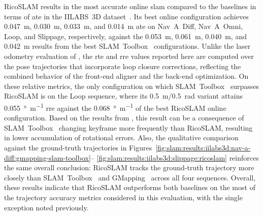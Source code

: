 RicoSLAM results in the most accurate online \gls{slam} compared to the
baselines in terms of \gls{ate} in the IILABS~3D dataset~\cite{ribeiro:access:2025}.
Its best online configuration achieves \SI{0.047}{\metre}, \SI{0.030}{\metre},
\SI{0.033}{\metre}, and \SI{0.014}{\metre} \gls{ate} on
Nav~A~Diff, Nav~A~Omni, Loop, and Slippage, respectively, against
the \SI{0.053}{\metre}, \SI{0.061}{\metre}, \SI{0.040}{\metre}, and
\SI{0.042}{\metre} results from the best
SLAM~Toolbox~\cite{macenski-jambrecic:joss:2021} configurations.
Unlike the laser odometry evaluation of ,
the \gls{rte} and \gls{rre} values reported here are computed over
the pose trajectories that incorporate loop closure corrections, reflecting
the combined behavior of the front-end aligner and the back-end optimization.
On these relative metrics, the only configuration on which
SLAM~Toolbox~\cite{macenski-jambrecic:joss:2021} surpasses RicoSLAM is on
the Loop sequence, where its \SI{0.5}{\metre}/\SI{0.5}{\radian} variant
attains \SI{0.055}{\degree\per\metre} \gls{rre} against the
\SI{0.068}{\degree\per\metre} of the best RicoSLAM online configuration.
Based on the results from , this
result can be a consequence of SLAM~Toolbox~\cite{macenski-jambrecic:joss:2021}
changing keyframe more frequently than RicoSLAM, resulting in lower accumulation
of rotational errors.
Also, the qualitative comparison against the ground-truth trajectories in
Figures~\ref{fig:slam:results:iilabs3d:nav-a-diff:gmapping-slam-toolbox}--%
\ref{fig:slam:results:iilabs3d:slippage:ricoslam} reinforces the same
overall conclusion: RicoSLAM tracks the ground-truth trajectory more closely
than SLAM~Toolbox~\cite{macenski-jambrecic:joss:2021} and
GMapping~\cite{grisetti:tro:2007} across all four sequences. Overall, these
results indicate that RicoSLAM outperforms both baselines on the most of the
trajectory accuracy metrics considered in this evaluation,
with the single exception noted previously.

